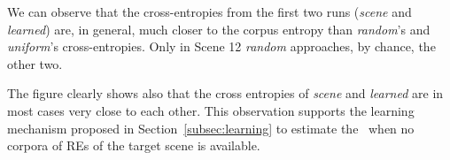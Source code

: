 We can observe that the cross-entropies from the first two runs (\emph{scene} and \emph{learned}) are, in general, much closer to the corpus entropy than \emph{random}'s and \emph{uniform}'s cross-entropies.  Only in Scene 12 \emph{random} approaches, by chance, the other two. 

The figure clearly shows also that the cross entropies of \emph{scene} and \emph{learned} are in most cases very close to each other. This observation supports the learning mechanism proposed in Section~\ref{subsec:learning} to estimate the \puse\ when no corpora of REs of the target scene is available. 
